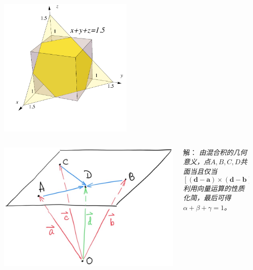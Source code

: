 \begin{frame}
	\linespread{1.5}
	\pause
	
	\bigskip
	
	\begin{center}
		\includegraphics[width=0.5\textwidth]{./images/ch8/HexCubic.pdf}
	\end{center}
	\fin
\end{frame}

\begin{frame}
	\linespread{1.5}
	
	\bigskip
	
	\begin{columns}
		\begin{column}{.5\textwidth}
			\begin{center}
				\includegraphics[width=.9\textwidth]{./images/ch8/abcd.jpg}
			\end{center}
		\end{column}
		\begin{column}{.5\textwidth}
			\small 解：\it
			由混合积的几何意义，点$A,B,C,D$共面当且仅当
			$$[(\bm{d}-\bm{a})\times(\bm{d}-\bm{b})]\cdot(\bm{d}-\bm{c})=0,$$
			利用向量运算的性质化简，最后可得$\alpha+\beta+\gamma=1$。\fin
		\end{column}
	\end{columns}
\end{frame}

